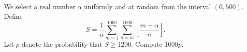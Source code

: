 We select a real number $\alpha$ uniformly and at random from the interval $(0,500)$.  Define \[ S = \frac{1}{\alpha} \sum_{m=1}^{1000} \sum_{n=m}^{1000} \left\lfloor \frac{m+\alpha}{n} \right\rfloor. \] Let $p$ denote the probability that $S \ge 1200$.  Compute $1000p$.
